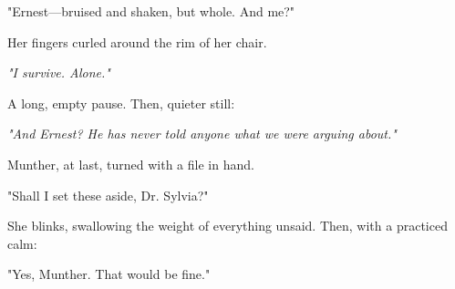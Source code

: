 \bigskip

"Ernest—bruised and shaken, but whole. And me?"

Her fingers curled around the rim of her chair.

\textit{"I survive. Alone."}

A long, empty pause. Then, quieter still:
\bigskip

\textit{"And Ernest? He has never told anyone what we were arguing about."}

\bigskip

Munther, at last, turned with a file in hand.

"Shall I set these aside, Dr. Sylvia?"

\bigskip

She blinks, swallowing the weight of everything unsaid. Then, with a practiced calm:

\bigskip

"Yes, Munther. That would be fine."
  

